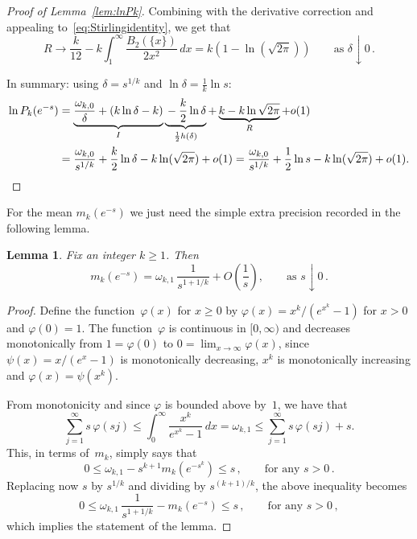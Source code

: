 \documentclass[12pt]{amsart}
\newtheorem{lemma}{Lemma}[section]
\theoremstyle{definition}
\begin{document}
\begin{proof}[Proof of Lemma~\ref{lem:lnPk}]
Combining with the derivative correction and appealing to~\eqref{eq:Stirlingidentity}, we get that
\[
R \longrightarrow \frac{k}{12} - k\int_1^{\infty} \frac{B_2(\{x\})}{2x^2}\, dx = k(1-\ln(\sqrt{2\pi})) \qquad \text{as } \delta\downarrow 0\,.
\]

\medskip

In summary: using $\delta=s^{1/k}$ and $\ln\delta = \frac{1}{k}\ln s$:
\begin{align*}
\ln P_k(e^{-s}) &= \underbrace{\frac{\omega_{k,0}}{\delta} + (k\ln\delta - k)}_{I} \underbrace{{}-\frac{k}{2}\ln\delta}_{\frac{1}{2}h(\delta)} + \underbrace{k - k\ln\sqrt{2\pi}}_{R} + o(1)\\
&= \frac{\omega_{k,0}}{s^{1/k}} + \frac{k}{2}\ln\delta - k\ln(\sqrt{2\pi}) + o(1) = \frac{\omega_{k,0}}{s^{1/k}} + \frac{1}{2}\ln s - k\ln(\sqrt{2\pi}) + o(1). \qedhere
\end{align*}
\end{proof}

For the mean $m_k(e^{-s})$ we just need the simple extra precision recorded in the following
lemma.

\begin{lemma}\label{lem:mk}
Fix an integer $k\ge 1$. Then
\begin{equation}\label{eq:mk}
m_k(e^{-s}) = \omega_{k,1}\,\frac{1}{s^{1+1/k}} + O\!\left(\frac{1}{s}\right), \qquad \text{as } s\downarrow 0\,.
\end{equation}
\end{lemma}

\begin{proof}
Define the function~$\varphi(x)$ for $x\ge 0$ by $\varphi(x) = x^k/(e^{x^k}-1)$ for $x>0$ and
$\varphi(0)=1$. The function~$\varphi$ is continuous in $[0,\infty)$ and decreases monotonically from
$1=\varphi(0)$ to $0=\lim_{x\to\infty}\varphi(x)$, since $\psi(x)=x/(e^x-1)$ is monotonically decreasing, $x^k$
is monotonically increasing and $\varphi(x)=\psi(x^k)$.
\smallskip

From monotonicity and since $\varphi$ is bounded above by~$1$, we have that
\[
\sum_{j=1}^{\infty} s\,\varphi(sj) \le \int_0^{\infty} \frac{x^k}{e^{x^k}-1}\, dx = \omega_{k,1} \le \sum_{j=1}^{\infty} s\,\varphi(sj) + s.
\]
This, in terms of~$m_k$, simply says that
\[
0 \le \omega_{k,1} - s^{k+1} m_k(e^{-s^k}) \le s\,, \qquad \text{for any } s>0\,.
\]
Replacing now $s$ by $s^{1/k}$ and dividing by $s^{(k+1)/k}$, the above inequality becomes
\[
0 \le \omega_{k,1}\,\frac{1}{s^{1+1/k}} - m_k(e^{-s}) \le s\,, \qquad \text{for any } s>0\,,
\]
which implies the statement of the lemma.
\end{proof}
\end{document}
